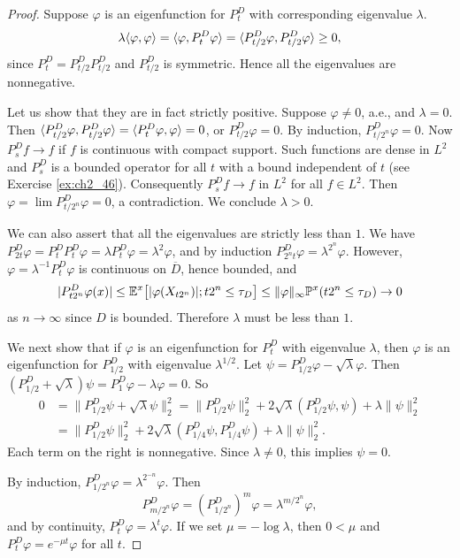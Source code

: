 \begin{proof}
Suppose $\varphi$ is an eigenfunction for $P_t^D$ with corresponding eigenvalue $\lambda$.
\[
    \lambda\langle \varphi,\varphi \rangle = \langle \varphi, P_t^D\varphi \rangle = \langle P_{t/2}^D\varphi, P_{t/2}^D\varphi \rangle \geq 0,
\]
since $P_t^D = P_{t/2}^DP_{t/2}^D$ and $P_{t/2}^D$ is symmetric. Hence all the eigenvalues are
nonnegative.

Let us show that they are in fact strictly positive. Suppose $\varphi \neq 0$, a.e., and $\lambda = 0$. Then $\langle P_{t/2}^D\varphi, P_{t/2}^D\varphi \rangle = \langle P_t^D\varphi, \varphi \rangle = 0$, or $P_{t/2}^D\varphi = 0$. By induction, $P_{t/2^n}^D\varphi = 0$. Now $P_s^Df \to f$ if $f$ is continuous with compact support. Such functions are dense in $L^2$ and $P_s^D$ is a bounded operator for all $t$ with a bound independent of $t$ (see Exercise \ref{ex:ch2_46}). Consequently $P_s^Df \to f$ in $L^2$ for all $f \in L^2$. Then $\varphi = \lim P_{t/2^n}^D\varphi = 0$, a contradiction. We conclude $\lambda > 0$.

We can also assert that all the eigenvalues are strictly less than $1$. We have $P_{2t}^D\varphi = P_t^DP_t^D\varphi = \lambda P_t^D\varphi = \lambda^2\varphi$, and by induction $P_{2^nt}^D\varphi = \lambda^{2^n}\varphi$. However, $\varphi = \lambda^{-1}P_t^D\varphi$ is continuous on $\overline{D}$, hence bounded, and
\[
    |P_{t2^n}^D\varphi(x)| \leq \mathbb{E}^x\big[|\varphi(X_{t2^n})|; t2^n \leq \tau_D\big] \leq \|\varphi\|_\infty\mathbb{P}^x(t2^n \leq \tau_D) \to 0
\]
as $n \to \infty$ since $D$ is bounded. Therefore $\lambda$ must be less than $1$.

We next show that if $\varphi$ is an eigenfunction for $P_t^D$ with eigenvalue $\lambda$, then $\varphi$ is an eigenfunction for $P_{1/2}^D$ with eigenvalue $\lambda^{1/2}$. Let $\psi = P_{1/2}^D\varphi - \sqrt{\lambda}\varphi$. Then $(P_{1/2}^D + \sqrt{\lambda})\psi = P_1^D\varphi - \lambda\varphi = 0$. So
\begin{align*}
    0 &= \|P_{1/2}^D\psi + \sqrt{\lambda}\psi\|_2^2 = \|P_{1/2}^D\psi\|_2^2 + 2\sqrt{\lambda}(P_{1/2}^D\psi, \psi) + \lambda\|\psi\|_2^2 \\
    &= \|P_{1/2}^D\psi\|_2^2 + 2\sqrt{\lambda}(P_{1/4}^D\psi, P_{1/4}^D\psi) + \lambda\|\psi\|_2^2.
\end{align*}
Each term on the right is nonnegative. Since $\lambda \neq 0$, this implies $\psi = 0$.

By induction, $P_{1/2^n}^D\varphi = \lambda^{2^{-n}}\varphi$. Then
\[
    P_{m/2^n}^D\varphi = (P_{1/2^n}^D)^m\varphi = \lambda^{m/2^n}\varphi,
\]
and by continuity, $P_t^D\varphi = \lambda^t\varphi$. If we set $\mu = -\log \lambda$, then $0 < \mu$ and $P_t^D\varphi = e^{-\mu t}\varphi$ for all $t$.


\end{proof}
